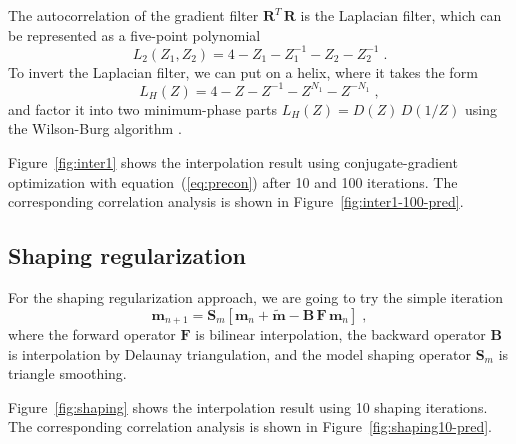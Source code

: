 The autocorrelation of the gradient filter $\mathbf{R}^T\,\mathbf{R}$
is the Laplacian filter, which can be represented as a five-point polynomial
\begin{equation}
\label{eq:lap2}
L_2(Z_1,Z_2) = 4 - Z_1 - Z_1^{-1} - Z_2 - Z_2^{-1}\;.
\end{equation} 
To invert the Laplacian filter, we can put on a helix, where it takes
the form
\begin{equation}
\label{eq:lap1}
L_H(Z) = 4 - Z - Z^{-1} - Z^{N_1} - Z^{-N_1}\;,
\end{equation} 
and factor it into two minimum-phase parts $L_H(Z) = D(Z)\,D(1/Z)$
using the Wilson-Burg algorithm \cite[]{burg}. 


Figure~\ref{fig:inter1} shows the interpolation result using
conjugate-gradient optimization with equation~(\ref{eq:precon}) after
10 and 100 iterations. The corresponding correlation analysis is shown
in Figure~\ref{fig:inter1-100-pred}.


\subsection{Shaping regularization}

For the shaping regularization approach, we are going to try the simple iteration
\begin{equation}
\label{eq:mshape1}
\mathbf{m}_{n+1} = \mathbf{S}_m\left[\mathbf{m}_{n} + \tilde{\mathbf{m}} -  \mathbf{B\,F\,m}_n\right]\;,
\end{equation}
where the forward operator $\mathbf{F}$ is bilinear interpolation, the
backward operator $\mathbf{B}$ is interpolation by Delaunay
triangulation, and the model shaping operator $\mathbf{S}_m$ is
triangle smoothing.

Figure~\ref{fig:shaping} shows the interpolation result using
10 shaping iterations. The corresponding correlation analysis is shown
in Figure~\ref{fig:shaping10-pred}.



